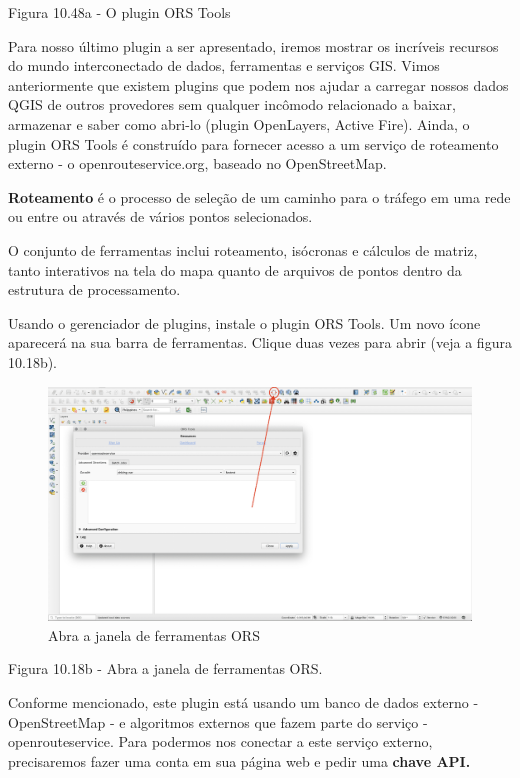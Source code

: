 \documentclass[
]{krantz}
\begin{document}
Figura 10.48a - O plugin ORS Tools

Para nosso último plugin a ser apresentado, iremos mostrar os incríveis recursos do mundo interconectado de dados, ferramentas e serviços GIS. Vimos anteriormente que existem plugins que podem nos ajudar a carregar nossos dados QGIS de outros provedores sem qualquer incômodo relacionado a baixar, armazenar e saber como abri-lo (plugin OpenLayers, Active Fire). Ainda, o plugin ORS Tools é construído para fornecer acesso a um serviço de roteamento externo - o openrouteservice.org, baseado no OpenStreetMap.

\textbf{Roteamento} é o processo de seleção de um caminho para o tráfego em uma rede ou entre ou através de vários pontos selecionados.

O conjunto de ferramentas inclui roteamento, isócronas e cálculos de matriz, tanto interativos na tela do mapa quanto de arquivos de pontos dentro da estrutura de processamento.

Usando o gerenciador de plugins, instale o plugin ORS Tools. Um novo ícone aparecerá na sua barra de ferramentas. Clique duas vezes para abrir (veja a figura 10.18b).

\begin{figure}
\centering
\includegraphics{media/modulo10/fig1018_b.png}
\caption{Abra a janela de ferramentas ORS}
\end{figure}

Figura 10.18b - Abra a janela de ferramentas ORS.

Conforme mencionado, este plugin está usando um banco de dados externo - OpenStreetMap - e algoritmos externos que fazem parte do serviço - openrouteservice. Para podermos nos conectar a este serviço externo, precisaremos fazer uma conta em sua página web e pedir uma \textbf{chave API.}
\end{document}
